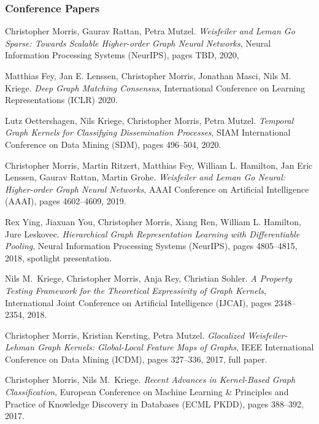 \documentclass[11pt, a4paper]{scrartcl}
\begin{document}
\begin{thebibliography}{5}
\subsubsection*{Conference Papers}
    Christopher Morris, Gaurav Rattan, Petra Mutzel.
\emph{Weisfeiler and Leman Go Sparse: Towards Scalable Higher-order Graph Neural Networks},
Neural Information Processing Systems (NeurIPS), pages TBD, 2020,


	Matthias Fey, Jan E. Lenssen, Christopher Morris, Jonathan Masci, Nils M. Kriege.
    \emph{Deep Graph Matching Consensus},
	International Conference on Learning Representations (ICLR) 2020.
	
	Lutz Oettershagen, Nils Kriege, Christopher Morris, Petra Mutzel.
	\emph{Temporal Graph Kernels for Classifying Dissemination Processes},
	SIAM International Conference on Data Mining (SDM), pages 496--504, 2020.
	
	Christopher Morris, Martin Ritzert, Matthias Fey, William L. Hamilton, Jan Eric Lenssen, Gaurav Rattan, Martin Grohe.
	\newblock \emph{Weisfeiler and Leman Go Neural: Higher-order Graph Neural Networks},
	\newblock AAAI Conference on Artificial Intelligence (AAAI), pages 4602--4609, 2019.
	
	Rex Ying, Jiaxuan You, Christopher Morris, Xiang Ren, William L. Hamilton, Jure Leskovec.
	\emph{Hierarchical Graph Representation Learning with Differentiable Pooling},
	Neural Information Processing Systems (NeurIPS), pages 4805--4815, 2018, spotlight presentation.
	
	Nils M.~Kriege, Christopher Morris, Anja Rey, Christian Sohler.
	\emph{A Property Testing Framework for the Theoretical Expressivity of Graph Kernels},
	International Joint Conference on Artificial Intelligence (IJCAI), pages 2348--2354, 2018.
	
    Christopher Morris, Kristian Kersting, Petra Mutzel.
	\emph{Glocalized Weisfeiler-Lehman Graph Kernels: Global-Local Feature Maps of Graphs},
	IEEE International Conference on Data Mining (ICDM), pages 327--336, 2017, full paper.
	
	Christopher Morris, Nils M.~Kriege.
	\emph{Recent Advances in Kernel-Based Graph Classification},
	European Conference on Machine Learning \& Principles and Practice of Knowledge Discovery in Databases (ECML PKDD), pages 388--392, 2017.
	

\end{thebibliography}
\end{document}
